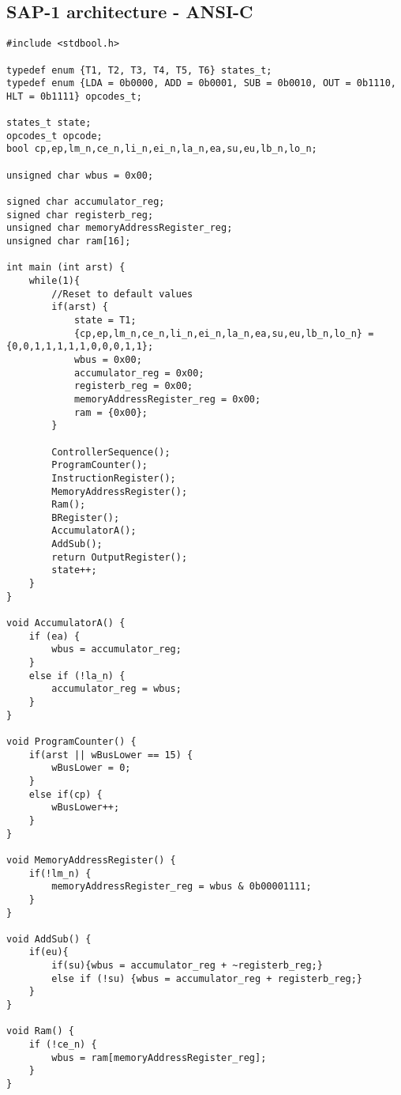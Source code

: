 \subsection{SAP-1 architecture - ANSI-C}
\begin{lstlisting}[caption=SAP-1 architecture implemented in C]
#include <stdbool.h>

typedef enum {T1, T2, T3, T4, T5, T6} states_t;
typedef enum {LDA = 0b0000, ADD = 0b0001, SUB = 0b0010, OUT = 0b1110, HLT = 0b1111} opcodes_t;

states_t state;
opcodes_t opcode;
bool cp,ep,lm_n,ce_n,li_n,ei_n,la_n,ea,su,eu,lb_n,lo_n; 
 
unsigned char wbus = 0x00;
 
signed char accumulator_reg;
signed char registerb_reg;
unsigned char memoryAddressRegister_reg;
unsigned char ram[16];
 
int main (int arst) {
	while(1){
		//Reset to default values
		if(arst) {
			state = T1;
			{cp,ep,lm_n,ce_n,li_n,ei_n,la_n,ea,su,eu,lb_n,lo_n} = {0,0,1,1,1,1,1,0,0,0,1,1};
			wbus = 0x00;
			accumulator_reg = 0x00;
			registerb_reg = 0x00;
			memoryAddressRegister_reg = 0x00;
			ram = {0x00};
		}
		
		ControllerSequence();
		ProgramCounter();
		InstructionRegister();
		MemoryAddressRegister();
		Ram();
		BRegister();
		AccumulatorA();
		AddSub();
		return OutputRegister();
		state++;
	}
}

void AccumulatorA() {
	if (ea) {
		wbus = accumulator_reg;
	}
	else if (!la_n) {
		accumulator_reg = wbus;
	}
}

void ProgramCounter() {
	if(arst || wBusLower == 15) {
		wBusLower = 0;
	}
	else if(cp) {
		wBusLower++;
	}
}

void MemoryAddressRegister() {
	if(!lm_n) {
		memoryAddressRegister_reg = wbus & 0b00001111;
	}
}

void AddSub() {
	if(eu){
		if(su){wbus = accumulator_reg + ~registerb_reg;}
		else if (!su) {wbus = accumulator_reg + registerb_reg;}
	}
}

void Ram() {
	if (!ce_n) {
		wbus = ram[memoryAddressRegister_reg];
	}
}


\end{lstlisting}
